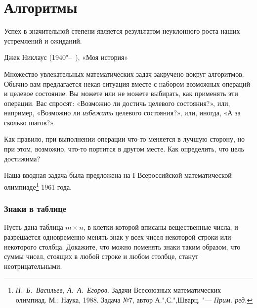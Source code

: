 \documentclass[twoside]{book}
\makeatletter
\newcommand{\rindex}[2][\imki@jobname]{%
\index[#1]{\detokenize{#2}}%
}
\newcommand\VsMO{\emph{Н.~Б.~Васильев, А.~А.~Егоров}. Задачи Всесоюзных математических олимпиад. М.: Наука, 1988}
\makeatother
\begin{document}
\chapter{Алгоритмы}

\thispagestyle{empty}


\setlength{\epigraphwidth}{.65\textwidth}
\epigraph{Успех в значительной степени является результатом неуклонного роста наших устремлений и ожиданий.\vspace{1ex}}{Джек Никлаус (1940"--~), «Моя история»}



Множество увлекательных математических задач закручено вокруг алгоритмов.
Обычно вам 
предлагается некая ситуация вместе с набором возможных операций и целевое состояние.
Вы можете или не можете выбирать, как применять эти операции.
Вас спросят: «Возможно ли достичь целевого состояния?», или, например, «Возможно ли \emph{избежать} целевого состояния?», или, иногда, «А за сколько шагов?».

Как правило, при выполнении операции что-то меняется в лучшую сторону, но при этом, возможно, что-то портится в другом месте.
Как определить, что цель достижима?

Наша вводная задача была предложена на I Всероссийской математической олимпиаде\footnote{%
\VsMO. Задача №7, автор А.",С.",Шварц. "--- \emph{Прим. ред.}}
1961 года.%

\subsection*{Знаки в таблице}%
\rindex{Знаки в таблице}

Пусть дана таблица $m\times n$, в клетки которой вписаны вещественные числа, и разрешается одновременно менять знак у всех чисел некоторой строки или некоторого столбца.
Докажите, что можно поменять знаки таким образом, что суммы чисел, стоящих в любой строке и любом столбце, станут неотрицательными.
\end{document}

